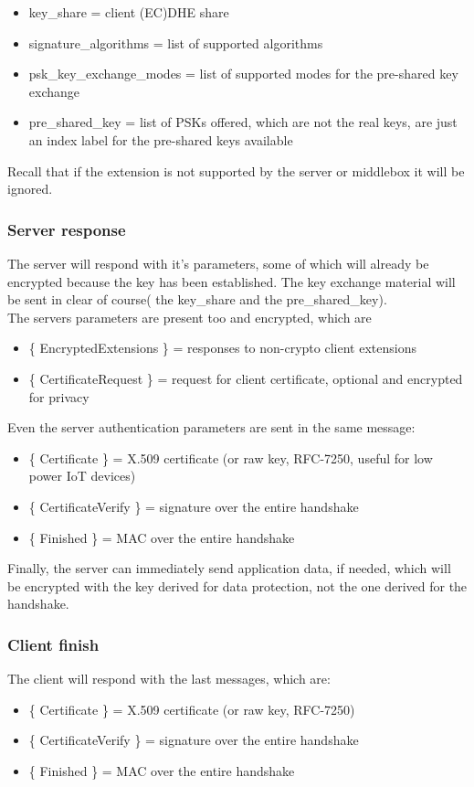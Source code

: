 \begin{itemize}
  \item key\_share = client (EC)DHE share
  \item signature\_algorithms = list of supported algorithms
  \item psk\_key\_exchange\_modes = list of supported modes for the
    pre-shared key exchange
  \item pre\_shared\_key = list of PSKs offered, which are not
    the real keys, are just an index label for the pre-shared keys
    available
\end{itemize}
Recall that if the extension is not supported by the server or
middlebox it will be ignored.
\subsubsection{Server response}
The server will respond with it's parameters, some of which will
already be encrypted because the key has been established. The key
exchange material will be sent in clear of course( the key\_share 
and the pre\_shared\_key).\\
The servers parameters are present too and encrypted, which are 
\begin{itemize}
\item \{ EncryptedExtensions \} = responses to non-crypto client
  extensions
\item \{ CertificateRequest \} = request for client certificate,
  optional and encrypted for privacy
\end{itemize}
Even the server authentication parameters are sent in the same
message:
\begin{itemize}
\item \{ Certificate \} = X.509 certificate (or raw key, RFC-7250,
  useful for low power IoT devices)
\item \{ CertificateVerify \} = signature over the entire handshake
\item \{ Finished \} = MAC over the entire handshake
\end{itemize}
Finally, the server can immediately send application data, if needed,
which will be encrypted with the key derived for data protection, not
the one derived for the handshake.
\subsubsection{Client finish}
The client will respond with the last messages, which are:
\begin{itemize}
  \item \{ Certificate \} = X.509 certificate (or raw key, RFC-7250)
  \item \{ CertificateVerify \} = signature over the entire handshake
  \item \{ Finished \} = MAC over the entire handshake
\end{itemize}
